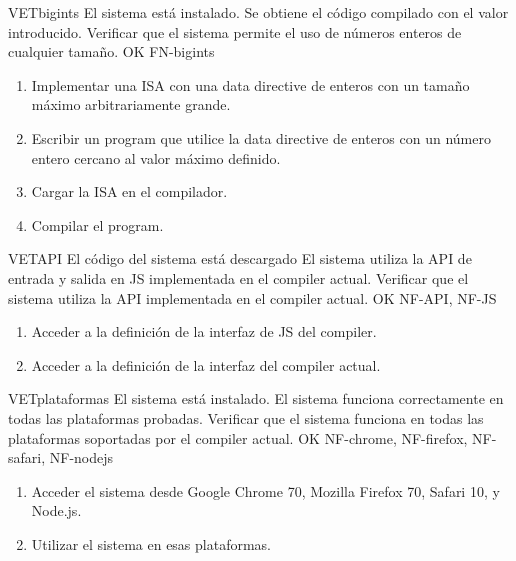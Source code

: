 \begin{testCase}{VET}{bigints}
    {El sistema está instalado.} %
    {Se obtiene el código compilado con el valor introducido.} %
    {Verificar que el sistema permite el uso de números enteros de cualquier tamaño.} %
    {OK} %
    {FN-bigints} %
    \begin{enumerate}[leftmargin=*, topsep=0pt, noitemsep] %
        \item Implementar una \gls{ISA} con una \gls{data directive} de
        enteros con un tamaño máximo arbitrariamente grande.
        \item Escribir un \gls{program} que utilice la \gls{data directive} de
        enteros con un número entero cercano al valor máximo definido.
        \item Cargar la \gls{ISA} en el compilador.
        \item Compilar el \gls{program}.
    \end{enumerate}
\end{testCase}

\begin{testCase}{VET}{API}
    {El código del sistema está descargado} %
    {El sistema utiliza la \gls{API} de entrada y salida en \gls{JS}
    implementada en el \gls{compiler} actual.} %
    {Verificar que el sistema utiliza la \gls{API} implementada en el \gls{compiler} actual.} %
    {OK} %
    {NF-API, NF-JS} %
    \begin{enumerate}[leftmargin=*, topsep=0pt, noitemsep] %
        \item Acceder a la definición de la interfaz de \gls{JS} del \gls{compiler}.
        \item Acceder a la definición de la interfaz del \gls{compiler} actual.
    \end{enumerate}
\end{testCase}

\begin{testCase}{VET}{plataformas}
    {El sistema está instalado.} %
    {El sistema funciona correctamente en todas las plataformas probadas.} %
    {Verificar que el sistema funciona en todas las plataformas soportadas por
    el \gls{compiler} actual.} %
    {OK} %
    {NF-chrome, NF-firefox, NF-safari, NF-nodejs} %
    \begin{enumerate}[leftmargin=*, topsep=0pt, noitemsep] %
        \item Acceder el sistema desde Google Chrome 70, Mozilla Firefox 70,
        Safari 10, y Node.js.
        \item Utilizar el sistema en esas plataformas.
    \end{enumerate}
\end{testCase}

